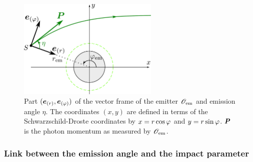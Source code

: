 \begin{figure}
\centerline{\includegraphics[width=0.6\textwidth]{gis_static_obs.pdf}}
\caption[]{\label{f:gis:static_obs} \footnotesize
Part $(\bm{e}_{(r)}, \bm{e}_{(\varphi)})$ of the vector frame of the emitter $\mathscr{O}_{\rm em}$
and emission angle $\eta$. The coordinates $(x,y)$ are defined in terms
of the Schwarzschild-Droste coordinates by $x=r\cos\varphi$ and $y=r\sin\varphi$.
$\bm{P}$ is the photon momentum as measured by $\mathscr{O}_{\rm em}$.}
\end{figure}

\subsubsection{Link between the emission angle and the impact parameter}

